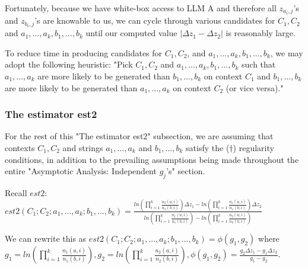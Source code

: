 \documentclass{article}
\begin{document}
Fortunately, because we have white-box access to LLM A and therefore all $\displaystyle z_{a_{i} ,j}$'s and $\displaystyle z_{b_{i} ,j}$'s are knowable to us, we can cycle through various candidates for $\displaystyle C_{1} ,C_{2}$ and $\displaystyle a_{1} ,...,a_{k} ,b_{1} ,...,b_{k}$ until our computed value $\displaystyle |\Delta z_{1} -\Delta z_{2} |$ is reasonably large.



To reduce time in producing candidates for $\displaystyle C_{1} ,C_{2}$, and $\displaystyle a_{1} ,...,a_{k} ,b_{1} ,...,b_{k}$, we may adopt the following heuristic: "Pick $\displaystyle C_{1} ,C_{2}$ and $\displaystyle a_{1} ,...,a_{k} ,b_{1} ,...,b_{k}$ such that $\displaystyle a_{1} ,...,a_{k}$ are more likely to be generated than $\displaystyle b_{1} ,...,b_{k}$ on context $\displaystyle C_{1}$ and $\displaystyle b_{1} ,...,b_{k}$ are more likely to be generated than $\displaystyle a_{1} ,...,a_{k}$ on context $\displaystyle C_{2}$ (or vice versa)."



\subsubsection{The estimator est2}
\begin{mdframed}
For the rest of this "The estimator est2" subsection, we are assuming that contexts $C_1, C_2$ and strings $a_1, \dots, a_k$ and $b_1, \dots, b_k$ satisfy the ($\dagger$) regularity conditions, in addition to the prevailing assumptions being made throughout the entire "Asymptotic Analysis: Independent $g_j$'s" section.
\end{mdframed}
Recall $\displaystyle est2$: $\displaystyle est2\left( C_{1} ;C_{2} ;a_{1} ,...,a_{k} ;b_{1} ,...,b_{k}\right) =\frac{ln\left(\prod _{i=1}^{k}\frac{n_{2}\left( a,i\right)}{n_{2}\left( b,i\right)}\right) \Delta z_{1} -ln\left(\prod _{i=1}^{k}\frac{n_{1}\left( a,i\right)}{n_{1}\left( b,i\right)}\right) \Delta z_{2}}{ln\left(\prod _{i=1}^{k}\frac{n_{1}\left( a,i\right)}{n_{1}\left( b,i\right)}\right) -ln\left(\prod _{i=1}^{k}\frac{n_{2}\left( a,i\right)}{n_{2}\left( b,i\right)}\right)}$



We can rewrite this as $\displaystyle est2\left( C_{1} ;C_{2} ;a_{1} ,...,a_{k} ;b_{1} ,...,b_{k}\right) =\phi \left( g_{1} ,g_{2}\right)$ where $\displaystyle g_{1} =ln\left(\prod _{i=1}^{k}\frac{n_{1}\left( a,i\right)}{n_{1}\left( b,i\right)}\right) ,g_{2} =ln\left(\prod _{i=1}^{k}\frac{n_{2}\left( a,i\right)}{n_{2}\left( b,i\right)}\right) ,\phi \left( g_{1} ,g_{2}\right) =\frac{g_{2} \Delta z_{1} -g_{1} \Delta z_{2}}{g_{1} -g_{2}}$.
\end{document}
